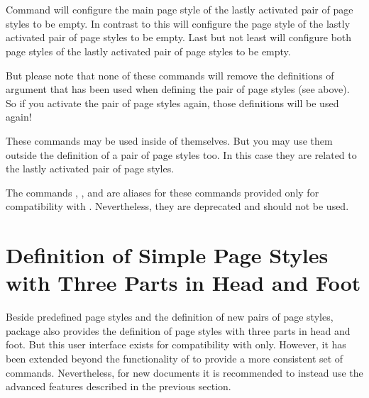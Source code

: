 \begin{Declaration}
  \\
  \\
\end{Declaration}
%
%
%
Command  will configure the main page style
of the lastly activated pair of page styles to be empty. In contrast to this
 will configure the  page
style of the lastly activated pair of page styles to be empty. Last but not
least  will configure both page styles of the
lastly activated pair of page styles to be empty.

But please note that none of these commands will remove
the definitions of argument  that has been used when
defining the pair of page styles (see above). So if you activate the pair of
page styles again, those definitions will be used again!

These commands may be used inside of  themselves. But you
may use them outside the definition of a pair of page styles too. In this case
they are related to the lastly activated pair of page styles.

%
%
%
The commands , , and
 are aliases for these commands provided only for
compatibility with . Nevertheless, they are deprecated and
should not be used.%
%
%
%
%
%
%
%


\section{Definition of Simple Page Styles with Three Parts in Head and Foot }
\label{sec:scrlayer-scrpage.pagestyle.triple}

Beside predefined page styles and the definition of new pairs of page styles,
package  also provides the definition of page styles
with three parts in head and foot. But this user interface exists for
compatibility with  only. However, it has been extended
beyond the functionality of  to provide a more consistent
set of commands. Nevertheless, for new documents it is recommended to instead
use the advanced features described in the previous section.


